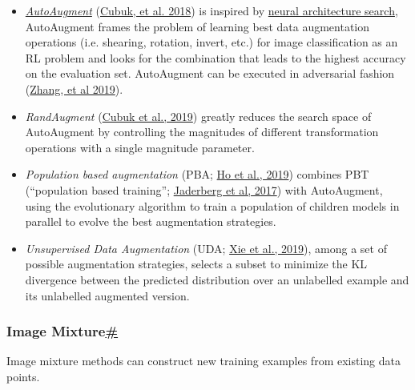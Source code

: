 \begin{itemize}
\tightlist
\item
  \href{https://lilianweng.github.io/posts/2019-05-05-domain-randomization/\#AutoAugment}{\emph{AutoAugment}} (\href{https://arxiv.org/abs/1805.09501}{Cubuk, et al. 2018}) is inspired by \href{https://lilianweng.github.io/posts/2020-08-06-nas/}{neural architecture search}, AutoAugment frames the problem of learning best data augmentation operations (i.e. shearing, rotation, invert, etc.) for image classification as an RL problem and looks for the combination that leads to the highest accuracy on the evaluation set. AutoAugment can be executed in adversarial fashion (\href{https://arxiv.org/abs/1912.11188}{Zhang, et al 2019}).
\item
  \emph{RandAugment} (\href{https://arxiv.org/abs/1909.13719}{Cubuk et al., 2019}) greatly reduces the search space of AutoAugment by controlling the magnitudes of different transformation operations with a single magnitude parameter.
\item
  \emph{Population based augmentation} (PBA; \href{https://arxiv.org/abs/1905.05393}{Ho et al., 2019}) combines PBT (``population based training''; \href{https://arxiv.org/abs/1711.09846}{Jaderberg et al, 2017}) with AutoAugment, using the evolutionary algorithm to train a population of children models in parallel to evolve the best augmentation strategies.
\item
  \emph{Unsupervised Data Augmentation} (UDA; \href{https://arxiv.org/abs/1904.12848}{Xie et al., 2019}), among a set of possible augmentation strategies, selects a subset to minimize the KL divergence between the predicted distribution over an unlabelled example and its unlabelled augmented version.
\end{itemize}

\subsubsection{\texorpdfstring{Image Mixture\hyperref[image-mixture]{\#}}{Image Mixture\#}}\label{image-mixture}

Image mixture methods can construct new training examples from existing data points.

